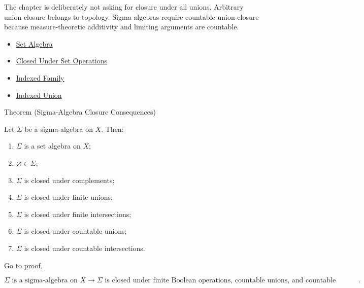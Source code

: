 \begin{remark*}[Exposition]
The chapter is deliberately not asking for closure under all unions.  Arbitrary
union closure belongs to topology.  Sigma-algebras require countable union
closure because measure-theoretic additivity and limiting arguments are
countable.
\end{remark*}


\begin{dependencies}
\begin{itemize}
  \item \hyperref[def:set-algebra]{Set Algebra}
  \item \hyperref[def:closed-under-set-operation-vocabulary]{Closed Under Set Operations}
  \item \hyperref[def:indexed-family]{Indexed Family}
  \item \hyperref[def:indexed-union]{Indexed Union}
\end{itemize}
\end{dependencies}

\begin{theorembox}{Theorem (Sigma-Algebra Closure Consequences)}
\begin{theorem}\label{thm:sigma-algebra-closure-consequences}
Let \(\Sigma\) be a sigma-algebra on \(X\).  Then:
\begin{enumerate}[label=(\roman*)]
\item \(\Sigma\) is a set algebra on \(X\);
\item \(\varnothing\in\Sigma\);
\item \(\Sigma\) is closed under complements;
\item \(\Sigma\) is closed under finite unions;
\item \(\Sigma\) is closed under finite intersections;
\item \(\Sigma\) is closed under countable unions;
\item \(\Sigma\) is closed under countable intersections.
\end{enumerate}
\hyperref[prf:sigma-algebra-closure-consequences]{Go to proof.}
\end{theorem}
\end{theorembox}

\begin{remark*}
\[
\Sigma\text{ is a sigma-algebra on }X
\to
\Sigma\text{ is closed under finite Boolean operations, countable unions, and countable intersections}.
\]
\end{remark*}

